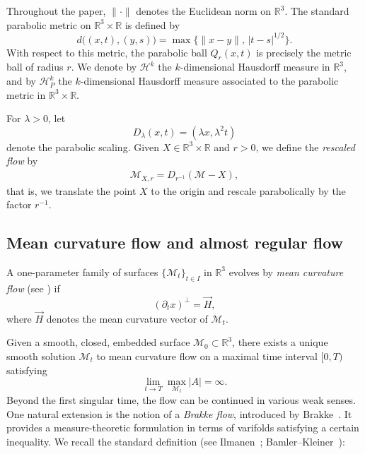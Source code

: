 \documentclass[11pt,reqno]{amsart}
\numberwithin{equation}{section}
\theoremstyle{definition}
\theoremstyle{remark}
\theoremstyle{remark}
\theoremstyle{remark}
\theoremstyle{remark}\newtheorem{conjecture}[equation]{Conjecture}
\theoremstyle{remark}\newtheorem{question}[equation]{Question}
\begin{document}
Throughout the paper, $\|\cdot\|$ denotes the Euclidean norm on $\mathbb{R}^3$.  
The standard parabolic metric on $\mathbb{R}^3 \times \mathbb{R}$ is defined by
\[
d\big( (x,t), (y,s) \big) = \max \{ \|x - y\|,\, |t - s|^{1/2} \}.
\]
With respect to this metric, the parabolic ball $Q_r(x,t)$ is precisely the metric ball of radius $r$.  
We denote by $\mathcal{H}^k$ the $k$-dimensional Hausdorff measure in $\mathbb{R}^3$, and by $\mathcal{H}^k_P$ the $k$-dimensional Hausdorff measure associated to the parabolic metric in $\mathbb{R}^3 \times \mathbb{R}$.

For $\lambda > 0$, let
\[
D_{\lambda}(x,t) = (\lambda x, \lambda^2 t)
\]
denote the parabolic scaling.  
Given $X \in \mathbb{R}^3 \times \mathbb{R}$ and $r>0$, we define the \emph{rescaled flow} by
\begin{align}\label{e:rescalingnotation}
   \mathcal{M}_{X,r} = D_{r^{-1}} (\mathcal{M} - X), 
\end{align}
that is, we translate the point $X$ to the origin and rescale parabolically by the factor $r^{-1}$.

\subsection{Mean curvature flow and almost regular flow}

A one-parameter family of surfaces $\{ \mathcal{M}_t \}_{t \in I}$ in $\mathbb{R}^3$ evolves by \emph{mean curvature flow} (see \cite{Hu84}) if
\[
(\partial_t x)^{\perp} = \vec{H},
\]
where $\vec{H}$ denotes the mean curvature vector of $\mathcal{M}_t$.

Given a smooth, closed, embedded surface $\mathcal{M}_0 \subset \mathbb{R}^3$, there exists a unique smooth solution $\mathcal{M}_t$ to mean curvature flow on a maximal time interval $[0,T)$ satisfying
\[
\lim_{t \to T} \max_{\mathcal{M}_t} |A| = \infty.
\]
Beyond the first singular time, the flow can be continued in various weak senses. One natural extension is the notion of a \emph{Brakke flow}, introduced by Brakke~\cite{Bra78}. It provides a measure-theoretic formulation in terms of varifolds satisfying a certain inequality. We recall the standard definition (see Ilmanen~\cite{Il94}; Bamler–Kleiner~\cite{BK23}):
\end{document}

